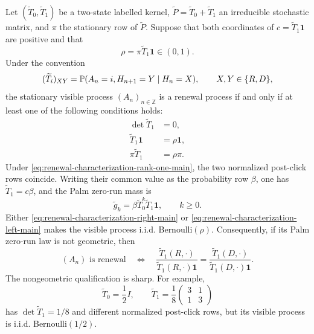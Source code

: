 \begin{theorem}
\label{thm:two-state-renewal-characterization-main}
Let \((\widetilde T_0,\widetilde T_1)\) be a two-state labelled kernel,
\(\widetilde P=\widetilde T_0+\widetilde T_1\) an irreducible stochastic
matrix, and \(\pi\) the stationary row of \(\widetilde P\).  Suppose that
both coordinates of \(c=\widetilde T_1\mathbf1\) are positive and that
\[
 \rho=\pi\widetilde T_1\mathbf1\in(0,1).
\]
Under the convention
\[
(\widetilde T_i)_{XY}
=\mathbb{P}(A_n=i,H_{n+1}=Y\mid H_n=X),\qquad X,Y\in\{R,D\},
\]
the stationary visible process \((A_n)_{n\in\mathbb Z}\) is a renewal
process if and only if at least one of the following conditions holds:
\begin{align}
\det \widetilde T_1&=0,                                      \tag{R}\label{eq:renewal-characterization-rank-one-main}\\
\widetilde T_1\mathbf1&=\rho\mathbf1,                       \tag{B\(_r\)}\label{eq:renewal-characterization-right-main}\\
\pi\widetilde T_1&=\rho\pi.                                 \tag{B\(_\ell\)}\label{eq:renewal-characterization-left-main}
\end{align}
Under \eqref{eq:renewal-characterization-rank-one-main}, the two normalized
post-click rows coincide.  Writing their common value as the probability row
\(\beta\), one has \(\widetilde T_1=c\beta\), and the Palm zero-run mass is
\[
 \widetilde g_k=\beta\widetilde T_0^k
                  \widetilde T_1\mathbf1,\qquad k\ge0.
\]
Either \eqref{eq:renewal-characterization-right-main} or
\eqref{eq:renewal-characterization-left-main} makes the visible process
i.i.d. Bernoulli\((\rho)\).  Consequently, if its Palm zero-run law is not
geometric, then
\[
(A_n)\text{ is renewal}
\quad\Longleftrightarrow\quad
\frac{\widetilde T_1(R,\cdot)}
     {\widetilde T_1(R,\cdot)\mathbf1}
=
\frac{\widetilde T_1(D,\cdot)}
     {\widetilde T_1(D,\cdot)\mathbf1}.
\]
The nongeometric qualification is sharp.  For example,
\[
 \widetilde T_0=\frac12 I,
 \qquad
 \widetilde T_1=\frac18
 \begin{pmatrix}3&1\\1&3\end{pmatrix}
\]
has \(\det\widetilde T_1=1/8\) and different normalized post-click rows,
but its visible process is i.i.d. Bernoulli\((1/2)\).
\end{theorem}


